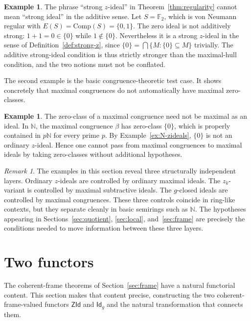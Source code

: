 \documentclass[11pt,leqno]{amsart}
\theoremstyle{plain}
\theoremstyle{definition}
\newtheorem{example}[theorem]{Example}
\theoremstyle{remark}
\newtheorem{remark}[theorem]{Remark}
\numberwithin{equation}{section}
\newcommand{\ZId}{\mathsf{ZId}}
\newcommand{\GCl}{\mathsf{Id}_{g}}
\newcommand{\N}{\mathds N}
\begin{document}
\begin{example}\label{ex:additive-strongness}
The phrase ``strong $z$-ideal'' in Theorem~\ref{thm:regularity}
cannot mean ``strong ideal'' in the additive sense.
Let $S=\mathds{F}_2$, which is von Neumann regular with
$E(S)=\mathrm{Comp}(S)=\{0,1\}$.
The zero ideal is not additively strong:
$1+1=0\in\{0\}$ while $1\notin\{0\}$.
Nevertheless it is a strong $z$-ideal in the sense of
Definition~\ref{def:strong-z}, since $\{0\}=\bigcap\{M:\{0\}\subseteq M\}$
trivially.
The additive strong-ideal condition is thus strictly stronger than
the maximal-hull condition, and the two notions must not be
conflated.
\end{example}

The second example is the basic congruence-theoretic test case.
It shows concretely that maximal congruences do not automatically
have maximal zero-classes.

\begin{example}\label{ex:max-cong-zero-class-not-max}
The zero-class of a maximal congruence need not be maximal as an
ideal.
In $\N$, the maximal congruence $\beta$ has zero-class $\{0\}$,
which is properly contained in $p\N$ for every prime $p$.
By Example~\ref{ex:N-zideals}, $\{0\}$ is not an ordinary $z$-ideal.
Hence one cannot pass from maximal congruences to maximal ideals
by taking zero-classes without additional hypotheses.
\end{example}

\begin{remark}\label{rem:example-conclusion}
The examples in this section reveal three structurally independent
layers.
Ordinary $z$-ideals are controlled by ordinary maximal ideals.
The $z_k$-variant is controlled by maximal subtractive ideals.
The $g$-closed ideals are controlled by maximal congruences.
These three controls coincide in ring-like contexts, but they
separate cleanly in basic semirings such as $\N$.
The hypotheses appearing in Sections~\ref{sec:quotient},
\ref{sec:local}, and~\ref{sec:frame} are precisely the conditions
needed to move information between these three layers.
\end{remark}

\section{Two functors}\label{sec:functors}

The coherent-frame theorems of Section~\ref{sec:frame} have a
natural functorial content.
This section makes that content precise,
constructing the two coherent-frame-valued functors $\ZId$ and
$\GCl$ and the natural transformation that connects them.
\end{document}
